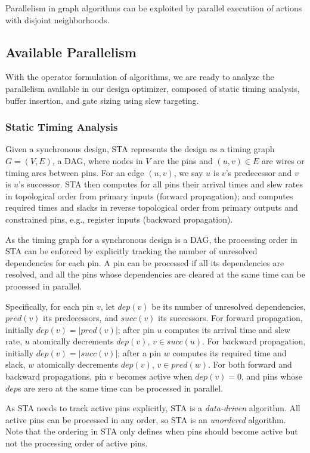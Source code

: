 Parallelism in graph algorithms can be exploited by parallel executiion of actions with disjoint neighborhoods.

\subsection{Available Parallelism}
\label{sec:avail_parallelism}

With the operator formulation of algorithms, we are ready to analyze the parallelism available in our design optimizer, composed of static timing analysis, buffer insertion, and gate sizing using slew targeting.

\subsubsection{Static Timing Analysis}
\label{sec:sta_parallel}

Given a synchronous design, STA represents the design as a timing graph $G = (V, E)$, a DAG, where nodes in $V$ are the pins and $(u, v) \in E$ are wires or timing arcs between pins. For an edge $(u, v)$, we say $u$ is $v$'s predecessor and $v$ is $u$'s successor. STA then computes for all pins their arrival times and slew rates in topological order from primary inputs (forward propagation); and computes required times and slacks in reverse topological order from primary outputs and constrained pins, e.g., register inputs (backward propagation).

As the timing graph for a synchronous design is a DAG, the processing order in STA can be enforced by explicitly tracking the number of unresolved dependencies for each pin. A pin can be processed if all its dependencies are resolved, and all the pins whose dependencies are cleared at the same time can be processed in parallel.

Specifically, for each pin $v$, let $dep(v)$ be its number of unresolved dependencies, $pred(v)$ its predecessors, and $succ(v)$ its successors. For forward propagation, initially $dep(v) = |pred(v)|$; after pin $u$ computes its arrival time and slew rate, $u$ atomically decrements $dep(v)$, $v \in succ(u)$. For backward propagation, initially $dep(v) = |succ(v)|$; after a pin $w$ computes its required time and slack, $w$ atomically decrements $dep(v)$, $v \in pred(w)$. For both forward and backward propagations, pin $v$ becomes active when $dep(v) = 0$, and pins whose $dep$s are zero at the same time can be processed in parallel.

As STA needs to track active pins explicitly, STA is a {\em data-driven} algorithm. All active pins can be processed in any order, so STA is an {\em unordered} algorithm. Note that the ordering in STA only defines when pins should become active but not the processing order of active pins.

